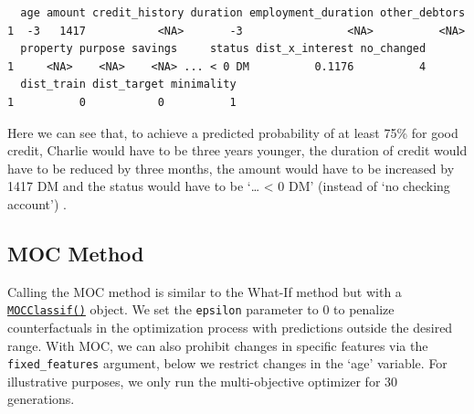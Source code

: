 \begin{Shaded}
\begin{Highlighting}[]
\OtherTok{=}\SpecialCharTok{$}
\OtherTok{=}\SpecialCharTok{$}
   \NormalTok{, } \NormalTok{(}\NormalTok{, }\NormalTok{))}
\SpecialCharTok{$}\NormalTok{(} \NormalTok{))}
\end{Highlighting}
\end{Shaded}

\begin{verbatim}
  age amount credit_history duration employment_duration other_debtors
1  -3   1417           <NA>       -3                <NA>          <NA>
  property purpose savings     status dist_x_interest no_changed
1     <NA>    <NA>    <NA> ... < 0 DM          0.1176          4
  dist_train dist_target minimality
1          0           0          1
\end{verbatim}

Here we can see that, to achieve a predicted probability of at least
75\% for good credit, Charlie would have to be three years younger, the
duration of credit would have to be reduced by three months, the amount
would have to be increased by 1417 DM and the status would have to be
`\ldots{} \textless{} 0 DM' (instead of `no checking account') .

\hypertarget{moc-method}{%
\subsection{MOC Method}\label{moc-method}}

Calling the MOC method is similar to the What-If method but with a
\href{https://www.rdocumentation.org/packages/counterfactuals/topics/MOCClassif}{\texttt{MOCClassif()}}
object. We set the \texttt{epsilon} parameter to 0 to penalize
counterfactuals in the optimization process with predictions outside the
desired range. With MOC, we can also prohibit changes in specific
features via the \texttt{fixed\_features} argument, below we restrict
changes in the `age' variable. For illustrative purposes, we only run
the multi-objective optimizer for 30 generations.

